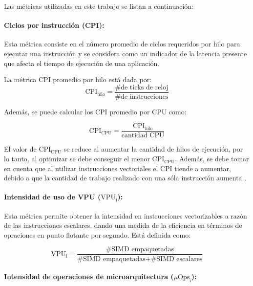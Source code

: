 Las métricas utilizadas en este trabajo se listan a continuación:

\paragraph*{Ciclos por instrucción (CPI):}

Esta métrica consiste en el número promedio de ciclos requeridos por hilo para ejecutar una instrucción y se considera como un indicador de la latencia presente que afecta el tiempo de ejecución de una aplicación.

La métrica CPI promedio por hilo está dada por:
\begin{equation}\label{eq:CPI_metric}
\text{CPI}_{\text{hilo}} = \frac{\text{\# de ticks de reloj}}{\# \text{de instrucciones}}
\end{equation}

Además, se puede calcular los CPI promedio por CPU como:

\begin{equation}\label{eq:CPIc_metric}
\text{CPI}_{\text{CPU}} = \frac{\text{CPI}_{\text{hilo}}}{\text{cantidad CPU}}
\end{equation}

El valor de $\text{CPI}_{\text{CPU}} $ se reduce al aumentar la cantidad de hilos de ejecución, por lo tanto, al optimizar se debe conseguir el menor $\text{CPI}_{\text{CPU}} $. Además, se debe tomar en cuenta que al utilizar instrucciones vectoriales el CPI tiende a aumentar, debido a que la cantidad de trabajo realizado con una sóla instrucción aumenta \cite{Jeffers2016315}.

\paragraph*{Intensidad de uso de VPU ($\text{VPU}_{\text{i}}$):}

Esta métrica permite obtener la intensidad en instrucciones vectorizables a razón de las instrucciones escalares, dando una medida de la eficiencia en términos de opraciones en punto flotante por segundo\cite{Jeffers2016315}. Está definida como:

\begin{equation}
\text{VPU}_{\text{i}}= \frac{\text{\# SIMD empaquetadas}}{\text{\# SIMD empaquetadas}+\text{\# SIMD escalares}}
\end{equation}


\paragraph*{Intensidad de operaciones de microarquitectura ($\mu\text{Ops}_{\text{i}}$):}

